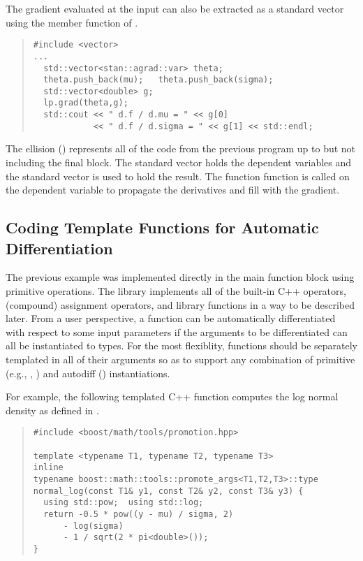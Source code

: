 \documentclass[10pt]{article}
\begin{document}
The gradient evaluated at the input can also be extracted as a
standard vector using the member function  of
.
%
\begin{quote}
\begin{Verbatim}
#include <vector>
...
  std::vector<stan::agrad::var> theta;
  theta.push_back(mu);   theta.push_back(sigma);
  std::vector<double> g;
  lp.grad(theta,g);
  std::cout << " d.f / d.mu = " << g[0]
            << " d.f / d.sigma = " << g[1] << std::endl;
\end{Verbatim}
\end{quote}
%
The ellision () represents all of the code from the previous
program up to but not including the final block.  The standard vector
 holds the dependent variables and the standard vector
 is used to hold the result.  The function 
function is called on the dependent variable to propagate the
derivatives and fill  with the gradient.

\subsection{Coding Template Functions for Automatic Differentiation}

The previous example was implemented directly in the main function
block using primitive operations.  The  library
implements all of the built-in C++ operators, (compound) assignment
operators, and library functions in a way to be described later.  From
a user perspective, a function can be automatically differentiated
with respect to some input parameters if the arguments to be
differentiated can all be instantiated to  types.
For the most flexiblity, functions should be separately templated in
all of their arguments so as to support any combination of primitive
(e.g., , ) and autodiff ()
instantiations.  

For example, the following templated C++ function computes the log
normal density as defined in .
\begin{quote}
\begin{Verbatim}
#include <boost/math/tools/promotion.hpp>

template <typename T1, typename T2, typename T3>
inline
typename boost::math::tools::promote_args<T1,T2,T3>::type
normal_log(const T1& y1, const T2& y2, const T3& y3) {
  using std::pow;  using std::log;  
  return -0.5 * pow((y - mu) / sigma, 2)
      - log(sigma)
      - 1 / sqrt(2 * pi<double>());
}
\end{Verbatim}
\end{quote}
%
\end{document}
